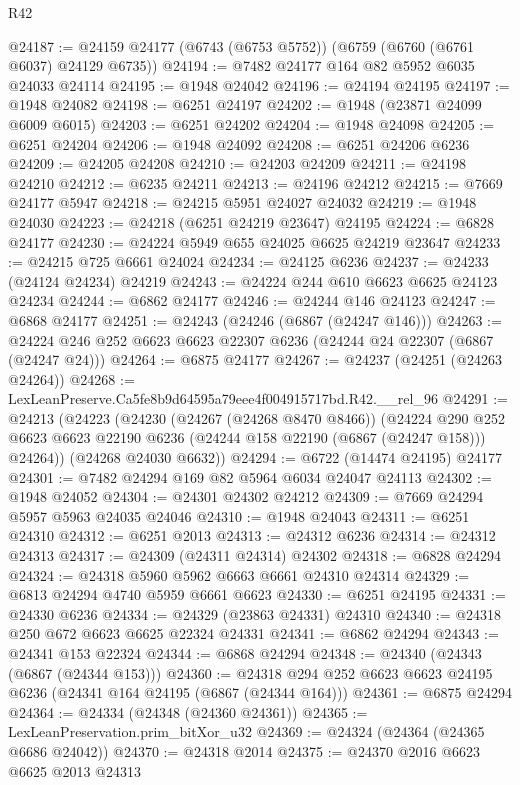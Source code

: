 \begin{lexlean}{R42}
\begin{coremodule}
{@24187 := @24159 @24177 (@6743 (@6753 @5752)) (@6759 (@6760 (@6761 @6037) @24129 @6735))
@24194 := @7482 @24177 @164 @82 @5952 @6035 @24033 @24114
@24195 := @1948 @24042
@24196 := @24194 @24195
@24197 := @1948 @24082
@24198 := @6251 @24197
@24202 := @1948 (@23871 @24099 @6009 @6015)
@24203 := @6251 @24202
@24204 := @1948 @24098
@24205 := @6251 @24204
@24206 := @1948 @24092
@24208 := @6251 @24206 @6236
@24209 := @24205 @24208
@24210 := @24203 @24209
@24211 := @24198 @24210
@24212 := @6235 @24211
@24213 := @24196 @24212
@24215 := @7669 @24177 @5947
@24218 := @24215 @5951 @24027 @24032
@24219 := @1948 @24030
@24223 := @24218 (@6251 @24219 @23647) @24195
@24224 := @6828 @24177
@24230 := @24224 @5949 @655 @24025 @6625 @24219 @23647
@24233 := @24215 @725 @6661 @24024
@24234 := @24125 @6236
@24237 := @24233 (@24124 @24234) @24219
@24243 := @24224 @244 @610 @6623 @6625 @24123 @24234
@24244 := @6862 @24177
@24246 := @24244 @146 @24123
@24247 := @6868 @24177
@24251 := @24243 (@24246 (@6867 (@24247 @146)))
@24263 := @24224 @246 @252 @6623 @6623 @22307 @6236 (@24244 @24 @22307 (@6867 (@24247 @24)))
@24264 := @6875 @24177
@24267 := @24237 (@24251 (@24263 @24264))
@24268 := LexLeanPreserve.Ca5fe8b9d64595a79eee4f004915717bd.R42.__rel_96
@24291 := @24213
    (@24223
      (@24230
        (@24267 (@24268 @8470 @8466))
        (@24224
          @290
          @252
          @6623
          @6623
          @22190
          @6236
          (@24244 @158 @22190 (@6867 (@24247 @158)))
          @24264))
      (@24268 @24030 @6632))
@24294 := @6722 (@14474 @24195) @24177
@24301 := @7482 @24294 @169 @82 @5964 @6034 @24047 @24113
@24302 := @1948 @24052
@24304 := @24301 @24302 @24212
@24309 := @7669 @24294 @5957 @5963 @24035 @24046
@24310 := @1948 @24043
@24311 := @6251 @24310
@24312 := @6251 @2013
@24313 := @24312 @6236
@24314 := @24312 @24313
@24317 := @24309 (@24311 @24314) @24302
@24318 := @6828 @24294
@24324 := @24318 @5960 @5962 @6663 @6661 @24310 @24314
@24329 := @6813 @24294 @4740 @5959 @6661 @6623
@24330 := @6251 @24195
@24331 := @24330 @6236
@24334 := @24329 (@23863 @24331) @24310
@24340 := @24318 @250 @672 @6623 @6625 @22324 @24331
@24341 := @6862 @24294
@24343 := @24341 @153 @22324
@24344 := @6868 @24294
@24348 := @24340 (@24343 (@6867 (@24344 @153)))
@24360 := @24318 @294 @252 @6623 @6623 @24195 @6236 (@24341 @164 @24195 (@6867 (@24344 @164)))
@24361 := @6875 @24294
@24364 := @24334 (@24348 (@24360 @24361))
@24365 := LexLeanPreservation.prim_bitXor_u32
@24369 := @24324 (@24364 (@24365 @6686 @24042))
@24370 := @24318 @2014
@24375 := @24370 @2016 @6623 @6625 @2013 @24313
}
\end{coremodule}
\end{lexlean}
